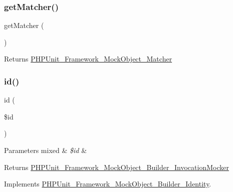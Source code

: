 \subsubsection{\texorpdfstring{get\+Matcher()}{getMatcher()}}
{\footnotesize\ttfamily get\+Matcher (\begin{DoxyParamCaption}{ }\end{DoxyParamCaption})}

\begin{DoxyReturn}{Returns}
\mbox{\hyperlink{class_p_h_p_unit___framework___mock_object___matcher}{P\+H\+P\+Unit\+\_\+\+Framework\+\_\+\+Mock\+Object\+\_\+\+Matcher}} 
\end{DoxyReturn}
\mbox{\label{class_p_h_p_unit___framework___mock_object___builder___invocation_mocker_a6ff64f57bb98d1f8903290a95f22dc43}} 
\subsubsection{\texorpdfstring{id()}{id()}}
{\footnotesize\ttfamily id (\begin{DoxyParamCaption}\item[{}]{\$id }\end{DoxyParamCaption})}


\begin{DoxyParams}[1]{Parameters}
mixed & {\em \$id} & \\
\hline
\end{DoxyParams}
\begin{DoxyReturn}{Returns}
\mbox{\hyperlink{class_p_h_p_unit___framework___mock_object___builder___invocation_mocker}{P\+H\+P\+Unit\+\_\+\+Framework\+\_\+\+Mock\+Object\+\_\+\+Builder\+\_\+\+Invocation\+Mocker}} 
\end{DoxyReturn}


Implements \mbox{\hyperlink{interface_p_h_p_unit___framework___mock_object___builder___identity_a6ff64f57bb98d1f8903290a95f22dc43}{P\+H\+P\+Unit\+\_\+\+Framework\+\_\+\+Mock\+Object\+\_\+\+Builder\+\_\+\+Identity}}.

